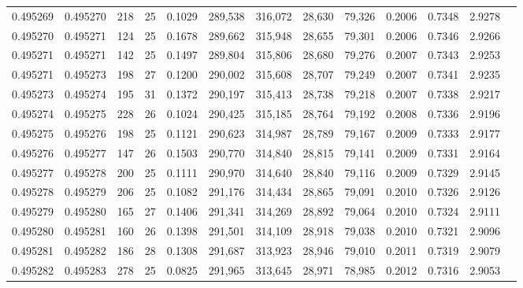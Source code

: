\begin{tabular}{rrrrrrrrrrrrr}
0.495269 & 0.495270 & 218 &  25 &                                     0.1029 & 289,538 & 316,072 &  28,630 &  79,326 & 0.2006 & 0.7348 & 2.9278 \\
0.495270 & 0.495271 & 124 &  25 &                                     0.1678 & 289,662 & 315,948 &  28,655 &  79,301 & 0.2006 & 0.7346 & 2.9266 \\
0.495271 & 0.495271 & 142 &  25 &                                     0.1497 & 289,804 & 315,806 &  28,680 &  79,276 & 0.2007 & 0.7343 & 2.9253 \\
0.495271 & 0.495273 & 198 &  27 &                                     0.1200 & 290,002 & 315,608 &  28,707 &  79,249 & 0.2007 & 0.7341 & 2.9235 \\
0.495273 & 0.495274 & 195 &  31 &                                     0.1372 & 290,197 & 315,413 &  28,738 &  79,218 & 0.2007 & 0.7338 & 2.9217 \\
0.495274 & 0.495275 & 228 &  26 &                                     0.1024 & 290,425 & 315,185 &  28,764 &  79,192 & 0.2008 & 0.7336 & 2.9196 \\
0.495275 & 0.495276 & 198 &  25 &                                     0.1121 & 290,623 & 314,987 &  28,789 &  79,167 & 0.2009 & 0.7333 & 2.9177 \\
0.495276 & 0.495277 & 147 &  26 &                                     0.1503 & 290,770 & 314,840 &  28,815 &  79,141 & 0.2009 & 0.7331 & 2.9164 \\
0.495277 & 0.495278 & 200 &  25 &                                     0.1111 & 290,970 & 314,640 &  28,840 &  79,116 & 0.2009 & 0.7329 & 2.9145 \\
0.495278 & 0.495279 & 206 &  25 &                                     0.1082 & 291,176 & 314,434 &  28,865 &  79,091 & 0.2010 & 0.7326 & 2.9126 \\
0.495279 & 0.495280 & 165 &  27 &                                     0.1406 & 291,341 & 314,269 &  28,892 &  79,064 & 0.2010 & 0.7324 & 2.9111 \\
0.495280 & 0.495281 & 160 &  26 &                                     0.1398 & 291,501 & 314,109 &  28,918 &  79,038 & 0.2010 & 0.7321 & 2.9096 \\
0.495281 & 0.495282 & 186 &  28 &                                     0.1308 & 291,687 & 313,923 &  28,946 &  79,010 & 0.2011 & 0.7319 & 2.9079 \\
0.495282 & 0.495283 & 278 &  25 &                                     0.0825 & 291,965 & 313,645 &  28,971 &  78,985 & 0.2012 & 0.7316 & 2.9053 \\

\end{tabular}
